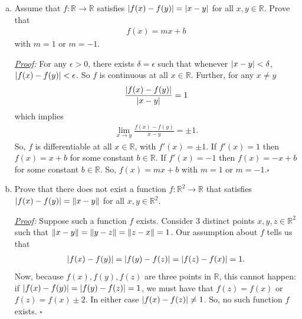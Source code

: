 \documentclass[11pt]{article}
\newcommand{\f}[2]{\frac{#1}{#2}}
\begin{document}
\begin{enumerate}[(a)]
	\item Assume that $f: \mathbb{R} \to \mathbb{R}$ satisfies $\abs{f(x) - f(y)} = \abs{x-y}$ for all $x,y\in \mathbb{R}$. Prove that 
	\begin{align*}
	f(x) = mx+b
	\end{align*}
	with $m=1$ or $m=-1$.
	
	\noindent \textit{\underline{Proof}:} For any $\epsilon > 0$, there exists $\delta = \epsilon$ such that whenever $\abs{x-y} < \delta$, $\abs{f(x) - f(y)} < \epsilon$. So $f$ is continuous at all $x\in \mathbb{R}$. Further, for any $x\neq y$
	\begin{align*}
	\f{\abs{f(x) - f(y)}}{\abs{x-y}} = 1
	\end{align*}
	which implies 
	\begin{align*}
	\lim_{x\to y}\f{f(x) - f(y)}{x-y} = \pm 1.
	\end{align*}
	So, $f$ is differentiable at all $x\in \mathbb{R}$, with $f'(x) = \pm 1$. If $f'(x) = 1$ then $f(x) = x+b$ for some constant $b\in \mathbb{R}$. If $f'(x) = -1$ then $f(x) = -x+b$ for some constant $b\in \mathbb{R}$. So, $f(x) = mx+b$ with $m=1$ or $m=-1$.\hfill$\square$
	
	
	
	
	
	
	
	\item Prove that there does not exist a function $f: \mathbb{R}^2 \to \mathbb{R}$ that satisfies $\abs{f(x) - f(y)} = \norm{x-y}$ for all $x,y\in \mathbb{R}^2$.
	
	
	
	\noindent \textit{\underline{Proof}:} Suppose such a function $f$ exists. Consider 3 distinct points $x,y,z\in \mathbb{R}^2$ such that $\norm{x-y} = \norm{y-z} = \norm{z-x} = 1$. Our assumption about $f$ tells us that 
	\begin{align*}
	\abs{f(x)-f(y)} = \abs{f(y) - f(z)} = \abs{f(z) - f(x)}=1.
	\end{align*} 
	Now, because $f(x),f(y),f(z)$ are three points in $\mathbb{R}$, this cannot happen: if $\abs{f(x) - f(y)} = \abs{f(y) -f(z)} = 1$, we must have that $f(z) = f(x)$ or $f(z) = f(x) \pm 2$. In either case $\abs{f(x) - f(z)}\neq 1$. So, no such function $f$ exists. \hfill$\square$ 
	
	
	
	
	
	
	
	
	

\end{enumerate}
\end{document}
